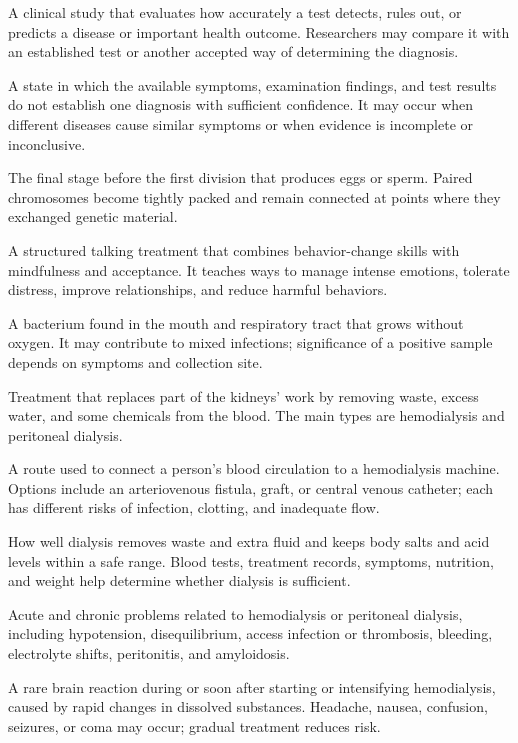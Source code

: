  A clinical study that evaluates how accurately a test detects, rules out, or predicts a disease or important health outcome. Researchers may compare it with an established test or another accepted way of determining the diagnosis.

 A state in which the available symptoms, examination findings, and test results do not establish one diagnosis with sufficient confidence. It may occur when different diseases cause similar symptoms or when evidence is incomplete or inconclusive.

 The final stage before the first division that produces eggs or sperm. Paired chromosomes become tightly packed and remain connected at points where they exchanged genetic material.

 A structured talking treatment that combines behavior-change skills with mindfulness and acceptance. It teaches ways to manage intense emotions, tolerate distress, improve relationships, and reduce harmful behaviors.

 A bacterium found in the mouth and respiratory tract that grows without oxygen. It may contribute to mixed infections; significance of a positive sample depends on symptoms and collection site.

 Treatment that replaces part of the kidneys’ work by removing waste, excess water, and some chemicals from the blood. The main types are hemodialysis and peritoneal dialysis.

 A route used to connect a person’s blood circulation to a hemodialysis machine. Options include an arteriovenous fistula, graft, or central venous catheter; each has different risks of infection, clotting, and inadequate flow.

 How well dialysis removes waste and extra fluid and keeps body salts and acid levels within a safe range. Blood tests, treatment records, symptoms, nutrition, and weight help determine whether dialysis is sufficient.

 Acute and chronic problems related to hemodialysis or peritoneal dialysis, including hypotension, disequilibrium, access infection or thrombosis, bleeding, electrolyte shifts, peritonitis, and amyloidosis.

 A rare brain reaction during or soon after starting or intensifying hemodialysis, caused by rapid changes in dissolved substances. Headache, nausea, confusion, seizures, or coma may occur; gradual treatment reduces risk.

